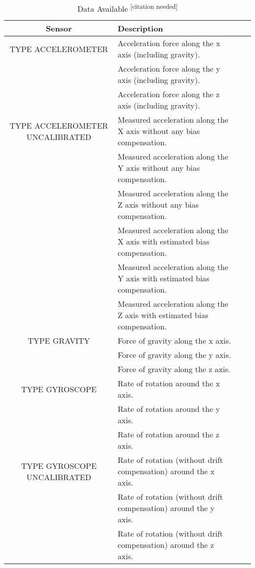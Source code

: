 \documentclass{UoNMCHA}
\newcommand{\citationneeded}{\textsuperscript{\color{blue} [citation needed]}}
\numberwithin{equation}{section}
\begin{document}
\begin{table}[h!]
    \begin{center}
        \caption{Data Available\citationneeded}\label{tab:AndroidDataAvailable}
        {\footnotesize
            \begin{tabular}{c l l l|}
                \hline\hline Sensor & Description \\ \hline 
                TYPE ACCELEROMETER & Acceleration force along the x axis (including gravity). \\
                 & Acceleration force along the y axis (including gravity). \\
                  & Acceleration force along the z axis (including gravity). \\
                TYPE ACCELEROMETER UNCALIBRATED & Measured acceleration along the X axis without any bias compensation. \\
                  & Measured acceleration along the Y axis without any bias compensation. \\
                  & Measured acceleration along the Z axis without any bias compensation. \\
                  & Measured acceleration along the X axis with estimated bias compensation. \\
                  & Measured acceleration along the Y axis with estimated bias compensation. \\
                  & Measured acceleration along the Z axis with estimated bias compensation. \\
                TYPE GRAVITY & Force of gravity along the x axis. \\
                 & Force of gravity along the y axis. \\
                 & Force of gravity along the z axis. \\
                TYPE GYROSCOPE & Rate of rotation around the x axis. \\
                  & Rate of rotation around the y axis. \\
                  & Rate of rotation around the z axis. \\
                TYPE GYROSCOPE UNCALIBRATED & Rate of rotation (without drift compensation) around the x axis. \\
                  & Rate of rotation (without drift compensation) around the y axis. \\
                  & Rate of rotation (without drift compensation) around the z axis. \\

\end{tabular}}
\end{center}
\end{table}
\end{document}
